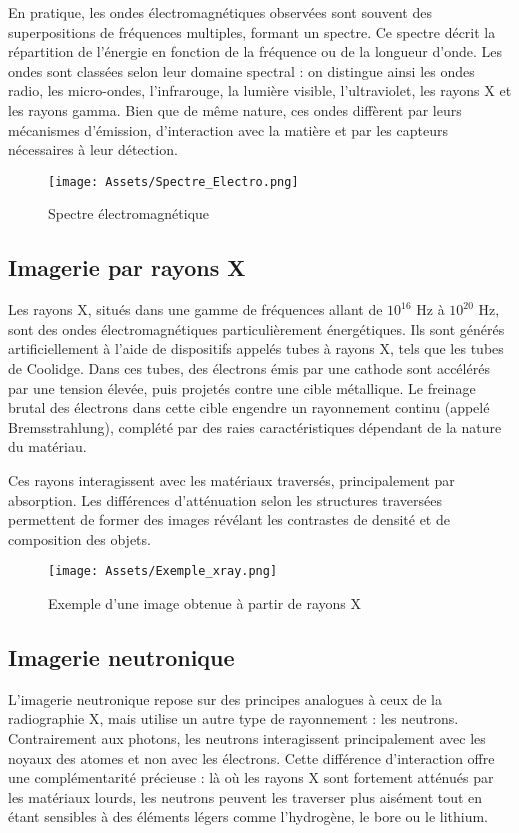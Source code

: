 \documentclass[12pt,a4paper]{report}
\begin{document}
En pratique, les ondes électromagnétiques observées sont souvent des superpositions de fréquences multiples, formant un spectre. Ce spectre décrit la répartition de l’énergie en fonction de la fréquence ou de la longueur d’onde. Les ondes sont classées selon leur domaine spectral : on distingue ainsi les ondes radio, les micro-ondes, l’infrarouge, la lumière visible, l’ultraviolet, les rayons X et les rayons gamma. Bien que de même nature, ces ondes diffèrent par leurs mécanismes d’émission, d’interaction avec la matière et par les capteurs nécessaires à leur détection.
\begin{figure}[H]
    \centering
    \texttt{[image: Assets/Spectre\_Electro.png]}
    \caption{Spectre électromagnétique}
    \label{fig:images}
\end{figure}

\subsection{Imagerie par rayons X}
Les rayons X, situés dans une gamme de fréquences allant de $10^{16}$ Hz à $10^{20}$ Hz, sont des ondes électromagnétiques particulièrement énergétiques. Ils sont générés artificiellement à l’aide de dispositifs appelés tubes à rayons X, tels que les tubes de Coolidge. Dans ces tubes, des électrons émis par une cathode sont accélérés par une tension élevée, puis projetés contre une cible métallique. Le freinage brutal des électrons dans cette cible engendre un rayonnement continu (appelé Bremsstrahlung), complété par des raies caractéristiques dépendant de la nature du matériau.

Ces rayons interagissent avec les matériaux traversés, principalement par absorption. Les différences d’atténuation selon les structures traversées permettent de former des images révélant les contrastes de densité et de composition des objets.

\begin{figure}[H]
    \centering
    \texttt{[image: Assets/Exemple\_xray.png]}
    \caption{Exemple d'une image obtenue à partir de rayons X}
    \label{fig:images}
\end{figure}

\subsection{Imagerie neutronique}
L’imagerie neutronique repose sur des principes analogues à ceux de la radiographie X, mais utilise un autre type de rayonnement : les neutrons. Contrairement aux photons, les neutrons interagissent principalement avec les noyaux des atomes et non avec les électrons. Cette différence d’interaction offre une complémentarité précieuse : là où les rayons X sont fortement atténués par les matériaux lourds, les neutrons peuvent les traverser plus aisément tout en étant sensibles à des éléments légers comme l’hydrogène, le bore ou le lithium.
\end{document}
